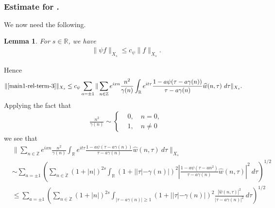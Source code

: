 \documentclass[12pt,reqno]{amsart}
\numberwithin{equation}{section}  %
\renewcommand{\cref}{\Cref}
\newcommand{\rr}{\mathbb{R}}
\newcommand{\zz}{\mathbb{Z}}
\newcommand{\zzdot}{\dot{\zz}}
\newcommand{\wh}{\widehat}
\newtheorem{lemma}[theorem]{Lemma}
\begin{document}
\subsubsection{Estimate for \cref{main1-rel-term-3}.}
%
%
%
%
%
%
%
%
%
We now need the following.
%
\begin{lemma}
\label{lem:schwartz-mult}
For $s\in \rr$, we have
%
%
\begin{equation}
	\label{schwartz-mult}
	\begin{split}
    \|\psi f \|_{X_{s}} \le c_{\psi}  \|f \|_{X_{s}}.
	\end{split}
\end{equation}
%
%
\end{lemma}
%
Hence
%
%
\begin{equation}
  \label{yu}
	\begin{split}
		\|\cref{main1-rel-term-3}\|_{X_{s}} 
    & \le c_{\psi} 
    \sum_{a = \pm 1} \| \sum_{n \in \zz}  e^{ixn} \frac{n^{2}}{\gamma(n)}\int_\rr 
		e^{it \tau} \frac{1 - a\psi (\tau - a\gamma(n) ) 
}{\tau - a\gamma(n)} \wh{w}(n, \tau) \ 
		d \tau\|_{X_{s}}.
			\end{split}
\end{equation}
%
Applying the fact that 
%
%
\begin{equation*}
\begin{split}
\frac{n^{2}}{\gamma(n)} \sim 
\begin{cases}
  & 0, \quad n=0, \\
  & 1, \quad n \neq 0
\end{cases}
\end{split}
\end{equation*}
%
%
we see that
%
%
\begin{equation}
\label{main-int2-est-X-s-part}
\begin{split}
  & \| \sum_{n \in \zz} e^{ixn} \frac{n^{2}}{\gamma(n)}\int_\rr 
		e^{it \tau} \frac{1 - a\psi (\tau - a\gamma(n) ) 
  }{\tau - a\gamma(n)} \wh{w}(n, \tau) \ 
		d \tau\|_{X_{s}}
		\\
    & \sim \sum_{a = \pm 1}\left( \sum_{n \in \zzdot} \left (1 + |n| \right )^{2s} \int_\rr
    (1 + |  |\tau| - \gamma(n)|)^{2} \left | \frac{1 - a\psi(\tau - an^{2 
})}{\tau - a\gamma(n)} 
     \wh{w}(n, \tau) \right |^2 \ d 
		\tau \right)^{1/2}
		\\
    & \le \sum_{a = \pm 1}
    \left( \sum_{n \in \zzdot} \left (1 + |n| \right )^{2s} \int_{| \tau - a\gamma(n)| \ge 1}
    (1 + | |\tau| - \gamma(n)|)^{2} \frac{|  \wh{w}(n, \tau)|^2}{|\tau - a\gamma(n)|^2} 
		\ d 
		\tau \right)^{1/2}
  \end{split}
\end{equation}
\end{document}
